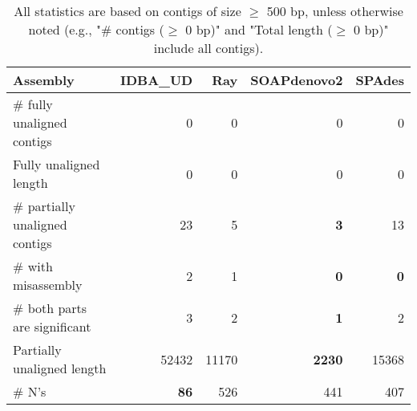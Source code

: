 \documentclass[12pt,a4paper]{article}
\begin{document}
\begin{table}[ht]
\begin{center}
\caption{All statistics are based on contigs of size $\geq$ 500 bp, unless otherwise noted (e.g., "\# contigs ($\geq$ 0 bp)" and "Total length ($\geq$ 0 bp)" include all contigs).}
\begin{tabular}{|l*{4}{|r}|}
\hline
Assembly & IDBA\_UD & Ray & SOAPdenovo2 & SPAdes \\ \hline
\# fully unaligned contigs & 0 & 0 & 0 & 0 \\ \hline
Fully unaligned length & 0 & 0 & 0 & 0 \\ \hline
\# partially unaligned contigs & 23 & 5 & {\bf 3} & 13 \\ \hline
\hspace{5mm}\# with misassembly & 2 & 1 & {\bf 0} & {\bf 0} \\ \hline
\hspace{5mm}\# both parts are significant & 3 & 2 & {\bf 1} & 2 \\ \hline
Partially unaligned length & 52432 & 11170 & {\bf 2230} & 15368 \\ \hline
\# N's & {\bf 86} & 526 & 441 & 407 \\ \hline
\end{tabular}
\end{center}
\end{table}
\end{document}
